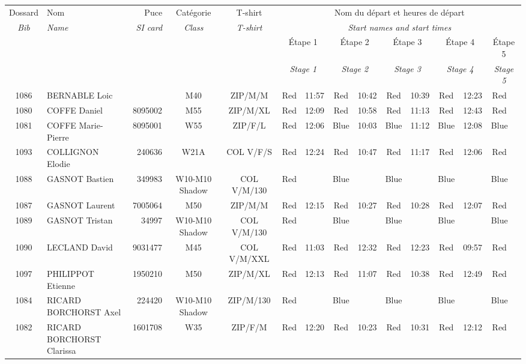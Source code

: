 \documentclass{report}
\begin{document}
  \begin{longtable}{|c|l|r|c|c|*{5}{cc|}}
    Dossard & Nom  & Puce    & Catégorie & T-shirt & \multicolumn{10}{c|}{Nom du départ et heures de départ} \\
    \itshape Bib     & \itshape Name & \itshape SI card & \itshape Class  & \itshape  T-shirt  & \multicolumn{10}{c|}{\itshape Start names and start times} \\
    \hline
    & & & & & \multicolumn{2}{c|}{Étape 1} & \multicolumn{2}{c|}{Étape 2} & \multicolumn{2}{c|}{Étape 3} & \multicolumn{2}{c|}{Étape 4} & \multicolumn{2}{c|}{Étape 5} \\
    & & & & & \multicolumn{2}{c|}{\itshape Stage 1} & \multicolumn{2}{c|}{\itshape Stage 2} & \multicolumn{2}{c|}{\itshape Stage 3} & \multicolumn{2}{c|}{\itshape Stage 4} & \multicolumn{2}{c|}{\itshape Stage 5} \\
    \hline
    1086 & BERNABLE Loic &  & M40 & ZIP/M/M & Red & 11:57 & Red & 10:42 & Red & 10:39 & Red & 12:23 & Red &  \\
    1080 & COFFE Daniel & 8095002 & M55 & ZIP/M/XL & Red & 12:09 & Red & 10:58 & Red & 11:13 & Red & 12:43 & Red &  \\
    1081 & COFFE Marie-Pierre & 8095001 & W55 & ZIP/F/L & Red & 12:06 & Blue & 10:03 & Blue & 11:12 & Blue & 12:08 & Blue &  \\
    1093 & COLLIGNON Elodie & 240636 & W21A & COL V/F/S & Red & 12:24 & Red & 10:47 & Red & 11:17 & Red & 12:06 & Red &  \\
    1088 & GASNOT Bastien & 349983 & W10-M10 Shadow & COL V/M/130 & Red &   & Blue &   & Blue &   & Blue &   & Blue &  \\
    1087 & GASNOT Laurent & 7005064 & M50 & ZIP/M/M & Red & 12:15 & Red & 10:27 & Red & 10:28 & Red & 12:07 & Red &  \\
    1089 & GASNOT Tristan & 34997 & W10-M10 Shadow & COL V/M/130 & Red &   & Blue &   & Blue &   & Blue &   & Blue &  \\
    1090 & LECLAND David & 9031477 & M45 & COL V/M/XXL & Red & 11:03 & Red & 12:32 & Red & 12:23 & Red & 09:57 & Red &  \\
    1097 & PHILIPPOT Etienne & 1950210 & M50 & ZIP/M/XL & Red & 12:13 & Red & 11:07 & Red & 10:38 & Red & 12:49 & Red &  \\
    1084 & RICARD BORCHORST Axel & 224420 & W10-M10 Shadow & ZIP/M/130 & Red &   & Blue &   & Blue &   & Blue &   & Blue &  \\
    1082 & RICARD BORCHORST Clarissa & 1601708 & W35 & ZIP/F/M & Red & 12:20 & Red & 10:23 & Red & 10:31 & Red & 12:12 & Red &  \\

\end{longtable}
\end{document}
